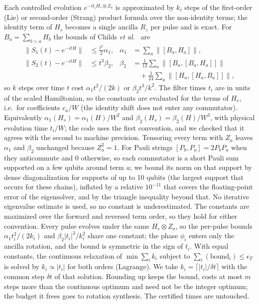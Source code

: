 \documentclass[aps,pra,twocolumn,superscriptaddress,nofootinbib]{revtex4-2}
\newcommand{\norm}[1]{\lVert#1\rVert}
\begin{document}
Each controlled evolution $e^{-it_iH_s\otimes Z_a}$ is approximated by $k_i$ steps of the first-order
(Lie) or second-order (Strang) product formula over the non-identity terms; the identity term of $H_s$
becomes a single ancilla $R_z$ per pulse and is exact. For $B_a=\sum_{b>a}H_b$ the bounds of Childs
\emph{et al.}~\cite[Props.~15--16]{Childs2021} are
\begin{align}
\norm{S_1(t)-e^{-itH}}&\le\tfrac{t^2}{2}\alpha_1,&\alpha_1&=\textstyle\sum_a\norm{[B_a,H_a]},\\
\norm{S_2(t)-e^{-itH}}&\le t^3\beta_2,&\beta_2&=\textstyle\frac1{12}\sum_a\norm{[B_a,[B_a,H_a]]}\nonumber\\
&&&\quad+\textstyle\frac1{24}\sum_a\norm{[H_a,[H_a,B_a]]},
\end{align}
so $k$ steps over time $t$ cost $\alpha_1t^2/(2k)$ or $\beta_2t^3/k^2$. The filter times $t_i$ are in
units of the scaled Hamiltonian, so the constants are evaluated for the terms of $H_s$, i.e.\ for
coefficients $c_a/W$ (the identity shift does not enter any commutator). Equivalently
$\alpha_1(H_s)=\alpha_1(H)/W^2$ and $\beta_2(H_s)=\beta_2(H)/W^3$, with physical evolution time
$t_i/W$; the code uses the first convention, and we checked that it agrees with the second to machine
precision. Tensoring every term with
$Z_a$ leaves $\alpha_1$ and $\beta_2$ unchanged because $Z_a^2=1$. For Pauli strings
$[P_b,P_a]=2P_bP_a$ when they anticommute and 0 otherwise, so each commutator is a short Pauli sum
supported on a few qubits around term $a$; we bound its norm on that support by dense diagonalization
for supports of up to 10 qubits (the largest support that occurs for these chains), inflated by a relative
$10^{-11}$ that covers the floating-point error of the eigensolver, and by the triangle inequality
beyond that. No iterative eigenvalue estimate is used, so no constant is underestimated. The
constants are maximized over the forward and reversed term order, so they hold for either convention.
Every pulse evolves under the same $H_s\otimes Z_a$, so the per-pulse bounds
$\alpha_1t_i^2/(2k_i)$ and $\beta_2|t_i|^3/k_i^2$ share one constant; the phase $\phi_i$ enters only the
ancilla rotation, and the bound is symmetric in the sign of $t_i$. With equal constants, the continuous
relaxation of $\min\sum_ik_i$ subject to $\sum_i(\text{bound}_i)\le\epsilon_T$ is solved by
$k_i\propto|t_i|$ for both orders (Lagrange). We take $k_i=\lceil|t_i|/\delta t\rceil$ with the common
step $\delta t$ of that solution. Rounding up keeps the bound, costs at most $m$ steps more than the
continuous optimum and need not be the integer optimum; the budget it frees goes to rotation synthesis.
The certified times are untouched.
\end{document}
